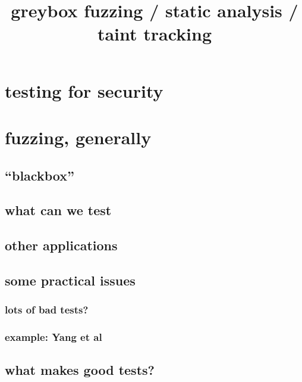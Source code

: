 \title{greybox fuzzing / static analysis / taint tracking}
\date{}

\begin{frame}
    \titlepage
\end{frame}



\section{testing for security}


\section{fuzzing, generally}


\subsection{``blackbox''}


\subsection{what can we test}


\subsection{other applications}


\subsection{some practical issues}


\subsubsection{lots of bad tests?}


\subsubsection{example: Yang et al}


\subsection{what makes good tests?} %


